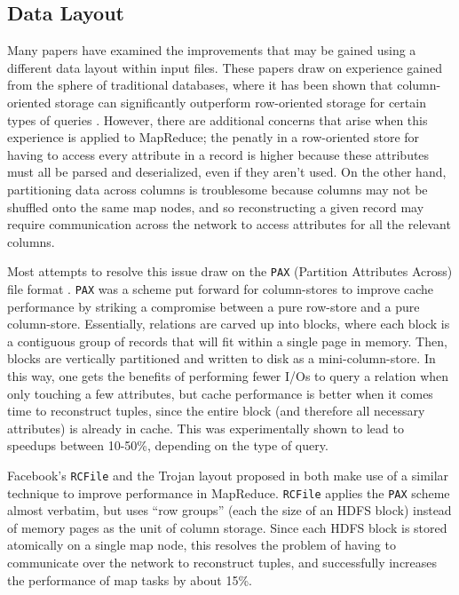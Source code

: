 \documentclass[twocolumn]{article}
\begin{document}
\subsection{Data Layout}

Many papers have examined the improvements that may be gained using a different
data layout within input files.  These papers draw on experience gained from 
the sphere of traditional databases, where it has been shown that column-oriented
storage can significantly outperform row-oriented storage for
certain types of queries \cite{ref:colstores}.  However, there are additional
concerns that arise when this experience is applied to MapReduce; the penatly
in a row-oriented store for having to access every attribute in a record is higher because
these attributes must all be parsed and deserialized, even if they aren't used.
On the other hand, partitioning data across columns is troublesome because 
columns may not be shuffled onto the same map nodes, and so reconstructing
a given record may require communication across the network to access attributes
for all the relevant columns.

Most attempts to resolve this issue draw on the \verb+PAX+ (Partition Attributes
Across) file format \cite{ref:pax}.  \verb+PAX+ was a scheme put forward for
column-stores to improve cache performance
by striking a compromise between a pure row-store and a pure column-store.  Essentially, 
relations are carved up into blocks, where each block is a contiguous group of
records that will fit within a single page in memory.  Then, blocks are
vertically partitioned and written to disk as a mini-column-store.  In this way, one
gets the benefits of performing fewer I/Os to query a relation when only touching a
few attributes, but cache performance is better when it comes time to reconstruct
tuples, since the entire block (and therefore all necessary attributes) is already
in cache.  This was experimentally shown to lead to speedups between 10-50\%,
depending on the type of query.

Facebook's \verb+RCFile+ and the Trojan layout proposed in
\cite{ref:trojan-layout} both make use of a similar technique to improve performance
in MapReduce.  \verb+RCFile+ applies the \verb+PAX+ scheme almost verbatim,
but uses ``row groups'' (each the size of an HDFS block) instead of memory
pages as the unit of column storage.  Since each HDFS block is stored atomically
on a single map node, this resolves the problem of having to communicate over the
network to reconstruct tuples, and successfully increases the performance of
map tasks by about 15\%.
\end{document}
